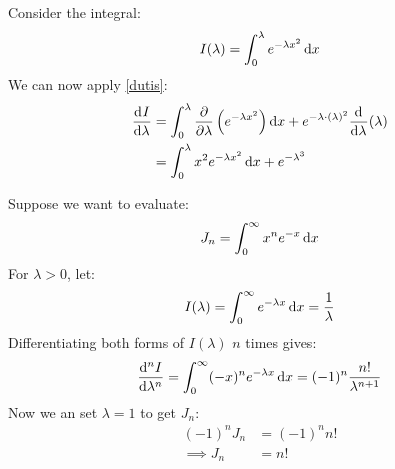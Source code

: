 \documentclass[../main.tex]{subfiles}
\begin{document}
\begin{example}
  Consider the integral:
  \[
    I(\lambda) = \int_{0}^{\lambda} e^{-\lambda x^2} \d{x}
  \]
  We can now apply \cref{dutis}:
  \begin{align*}
    \deriv{I}{\lambda} &= \int_{0}^{\lambda} \pderiv{}{\lambda}\left(e^{-\lambda x^2}\right) \d{x} + e^{-\lambda \cdot (\lambda)^2} \deriv{}{\lambda}(\lambda) \\
                       &= \int_{0}^{\lambda} x^2 e^{-\lambda x^2} \d{x} + e^{-\lambda^3}
  \end{align*}
\end{example}
\begin{example}
  Suppose we want to evaluate:
  \[
    J_n = \int_{0}^{\infty} x^{n}e^{-x} \d{x}
  \]
  For $\lambda > 0$, let:
  \[
    I(\lambda) = \int_{0}^{\infty} e^{-\lambda x} \d{x} = \frac{1}{\lambda}
  \]
  Differentiating both forms of $I(\lambda)$ $n$ times gives:
  \[
    \deriv[n]{I}{\lambda} = \int_{0}^{\infty} (-x)^{n} e^{-\lambda x} \d{x} = (-1)^{n}\frac{n!}{\lambda^{n+1}}
  \]
  Now we an set $\lambda = 1$ to get $J_n$:
  \begin{align*}
    (-1)^{n} J_n &= (-1)^{n} n! \\
    \implies J_n &= n! \\
  \end{align*}
\end{example}
\end{document}
